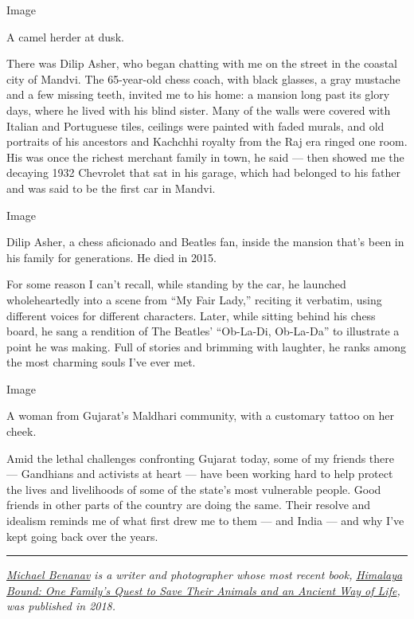 Image

A camel herder at dusk.

There was Dilip Asher, who began chatting with me on the street in the
coastal city of Mandvi. The 65-year-old chess coach, with black glasses,
a gray mustache and a few missing teeth, invited me to his home: a
mansion long past its glory days, where he lived with his blind sister.
Many of the walls were covered with Italian and Portuguese tiles,
ceilings were painted with faded murals, and old portraits of his
ancestors and Kachchhi royalty from the Raj era ringed one room. His was
once the richest merchant family in town, he said --- then showed me the
decaying 1932 Chevrolet that sat in his garage, which had belonged to
his father and was said to be the first car in Mandvi.

Image

Dilip Asher, a chess aficionado and Beatles fan, inside the mansion
that's been in his family for generations. He died in 2015.

For some reason I can't recall, while standing by the car, he launched
wholeheartedly into a scene from ``My Fair Lady,'' reciting it verbatim,
using different voices for different characters. Later, while sitting
behind his chess board, he sang a rendition of The Beatles' ``Ob-La-Di,
Ob-La-Da'' to illustrate a point he was making. Full of stories and
brimming with laughter, he ranks among the most charming souls I've ever
met.

Image

A woman from Gujarat's Maldhari community, with a customary tattoo on
her cheek.

Amid the lethal challenges confronting Gujarat today, some of my friends
there --- Gandhians and activists at heart --- have been working hard to
help protect the lives and livelihoods of some of the state's most
vulnerable people. Good friends in other parts of the country are doing
the same. Their resolve and idealism reminds me of what first drew me to
them --- and India --- and why I've kept going back over the years.

\begin{center}\rule{0.5\linewidth}{\linethickness}\end{center}

\href{https://michaelbenanav.com/}{\emph{Michael Benanav}} \emph{is a
writer and photographer whose most recent book,}
\href{https://himalayabound.com/}{\emph{Himalaya Bound: One Family's
Quest to Save Their Animals and an Ancient Way of Life}}\emph{, was
published in 2018.}

